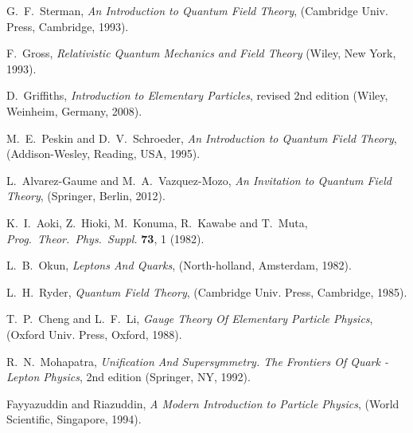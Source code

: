 \documentclass{ws-ijmpa}
\begin{document}
\begin{thebibliography}{00}
G.~F.~Sterman,
\textit{An Introduction to Quantum Field Theory},
(Cambridge Univ. Press, Cambridge, 1993).

  F.~Gross,
\textit{Relativistic Quantum Mechanics and Field Theory}
(Wiley, New York, 1993).

D.~Griffiths,
\textit{Introduction to Elementary Particles},
revised 2nd edition (Wiley, Weinheim, Germany, 2008).


M.~E.~Peskin and D.~V.~Schroeder,
\textit{An Introduction to Quantum Field Theory},
(Addison-Wesley, Reading, USA, 1995).

L.~Alvarez-Gaume and M.~A.~Vazquez-Mozo,
\textit{An Invitation to Quantum Field Theory},
(Springer, Berlin, 2012).


K.~I.~Aoki, Z.~Hioki, M.~Konuma, R.~Kawabe and T.~Muta,
\textit{Prog.\ Theor.\ Phys.\ Suppl.}  \textbf{73}, 1 (1982).

L.~B.~Okun,
\textit{Leptons And Quarks},
(North-holland, Amsterdam, 1982).

L.~H.~Ryder,
\textit{Quantum Field Theory},
(Cambridge Univ. Press, Cambridge, 1985).

T.~P.~Cheng and L.~F.~Li,
\textit{Gauge Theory Of Elementary Particle Physics},
(Oxford Univ. Press, Oxford, 1988).

R.~N.~Mohapatra,
\textit{Unification And Supersymmetry. The Frontiers Of Quark - Lepton Physics},
2nd edition (Springer, NY, 1992).

Fayyazuddin and Riazuddin,
\textit{A Modern Introduction to Particle Physics},
(World Scientific, Singapore, 1994).


\end{thebibliography}
\end{document}
